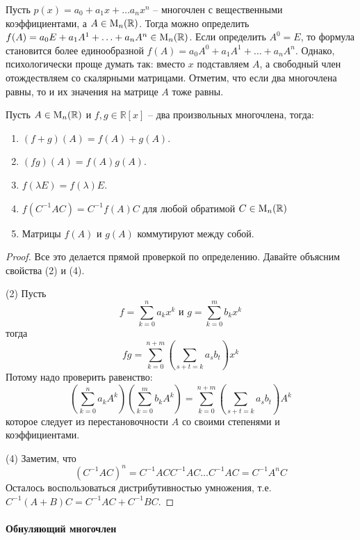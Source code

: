 Пусть $p(x) = a_0+a_1x+\ldots a_n x^n$ -- многочлен с вещественными коэффициентами, а $A\in\operatorname{M}_{n}(\mathbb R)$.
Тогда можно определить $f(A)= a_0 E + a_1 A^1 + \ldots + a_n A^n\in\operatorname{M}_{n}(\mathbb R)$.
Если определить $A^0 = E$, то формула становится более единообразной $f(A)= a_0 A^0 + a_1 A^1 + \ldots + a_n A^n$.
Однако, психологически проще думать так: вместо $x$ подставляем $A$, а свободный член отождествляем со скалярными матрицами.
Отметим, что если два многочлена равны, то и их значения на матрице $A$ тоже равны.

\begin{claim*}
Пусть $A\in\operatorname{M}_{n}(\mathbb R)$ и $f,g\in\mathbb R[x]$ -- два произвольных многочлена, тогда:
\begin{enumerate}
\item $(f+g)(A) = f(A) + g(A)$.

\item $(fg)(A) = f(A)g(A)$.

\item $f(\lambda E) = f(\lambda)E$.

\item $f(C^{-1}AC) = C^{-1}f(A)C$ для любой обратимой $C\in \operatorname{M}_{n}(\mathbb R)$

\item Матрицы $f(A)$ и $g(A)$ коммутируют между собой.
\end{enumerate}
\end{claim*}
\begin{proof}
Все это делается прямой проверкой по определению.
Давайте объясним свойства (2) и (4).

(2) Пусть 
\[
f = \sum_{k=0}^na_k x^k\text{ и }g = \sum_{k=0}^m b_k x^k
\]
тогда 
\[
fg = \sum_{k=0}^{n + m} \left(\sum_{s + t = k }a_s b_t\right) x^k
\]
Потому надо проверить равенство:
\[
\left(\sum_{k=0}^n a_k A^k\right)\left(\sum_{k=0}^mb_k A^k\right) = \sum_{k=0}^{n+m}\left(\sum_{s+t = k} a_s b_t\right)A^k
\]
которое следует из перестановочности $A$ со своими степенями и коэффициентами.

(4) Заметим, что
\[
(C^{-1}AC)^n = C^{-1}ACC^{-1}AC\ldots C^{-1}AC = C^{-1}A^nC
\]
Осталось воспользоваться дистрибутивностью умножения, т.е. $C^{-1}(A + B)C = C^{-1}AC + C^{-1}BC$.
\end{proof}

\paragraph{Обнуляющий многочлен}

